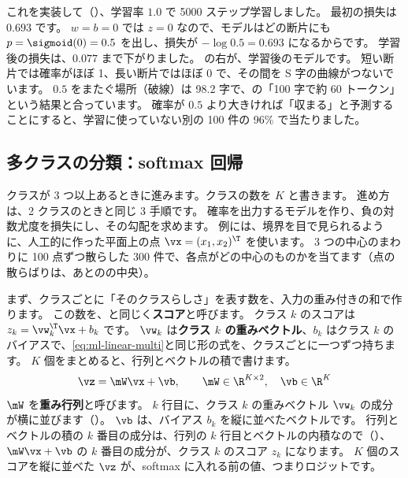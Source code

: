 これを実装して（）、学習率 $1.0$ で 5000 ステップ学習しました。
最初の損失は $0.693$ です。
$w=b=0$ では $z=0$ なので、モデルはどの断片にも $p=\sigmoid(0)=0.5$ を出し、損失が $-\log 0.5=0.693$ になるからです。
学習後の損失は、$0.077$ まで下がりました。
の右が、学習後のモデルです。
短い断片では確率がほぼ 1、長い断片ではほぼ 0 で、その間を S 字の曲線がつないでいます。
$0.5$ をまたぐ場所（破線）は 98.2 字で、の「100 字で約 60 トークン」という結果と合っています。
確率が $0.5$ より大きければ「収まる」と予測することにすると、学習に使っていない別の 100 件の 96\% で当たりました。

\subsection*{多クラスの分類：softmax 回帰}

クラスが 3 つ以上あるときに進みます。クラスの数を $K$ と書きます。
進め方は、2 クラスのときと同じ 3 手順です。
確率を出力するモデルを作り、負の対数尤度を損失にし、その勾配を求めます。
例には、境界を目で見られるように、人工的に作った平面上の点 $\vx=(x_1,x_2)^\T$ を使います。
3 つの中心のまわりに 100 点ずつ散らした 300 件で、各点がどの中心のものかを当てます（点の散らばりは、あとのの中央）。

まず、クラスごとに「そのクラスらしさ」を表す数を、入力の重み付きの和で作ります。
この数を、と同じく\textbf{スコア}と呼びます。
クラス $k$ のスコアは $z_k = \vw_k^\T\vx + b_k$ です。
$\vw_k$ は\textbf{クラス $k$ の重みベクトル}、$b_k$ はクラス $k$ のバイアスで、\eqref{eq:ml-linear-multi}と同じ形の式を、クラスごとに一つずつ持ちます。
$K$ 個をまとめると、行列とベクトルの積で書けます。
\begin{equation}
\vz = \mW\vx + \vb,\qquad \mW\in\R^{K\times 2},\quad \vb\in\R^{K}
\label{eq:ml-logits}
\end{equation}
$\mW$ を\textbf{重み行列}と呼びます。
$k$ 行目に、クラス $k$ の重みベクトル $\vw_k$ の成分が横に並びます（）。
$\vb$ は、バイアス $b_k$ を縦に並べたベクトルです。
行列とベクトルの積の $k$ 番目の成分は、行列の $k$ 行目とベクトルの内積なので（）、$\mW\vx+\vb$ の $k$ 番目の成分が、クラス $k$ のスコア $z_k$ になります。
$K$ 個のスコアを縦に並べた $\vz$ が、softmax に入れる前の値、つまりロジットです。

